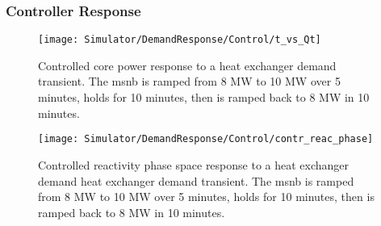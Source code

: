 \subsubsection{Controller Response}
\begin{figure}[ht!]
    \centering
    \texttt{[image: Simulator/DemandResponse/Control/t\_vs\_Qt]}
    \caption[Controlled Demand-Response Power Response ]{Controlled core power response to a heat exchanger demand transient. The \acs{msnb} is ramped from 8 MW to 10 MW over 5 minutes, holds for 10 minutes, then is ramped back to 8 MW in 10 minutes.}
    \label{fig:Demand-Power-Ctr}
\end{figure}

\begin{figure}[ht!]
    \centering
    \texttt{[image: Simulator/DemandResponse/Control/contr\_reac\_phase]}
    \caption[Controlled Demand-Response Reactivity Phase Space]{Controlled reactivity phase space response to a heat exchanger demand heat exchanger demand transient. The \acs{msnb} is ramped from 8 MW to 10 MW over 5 minutes, holds for 10 minutes, then is ramped back to 8 MW in 10 minutes.}
    \label{fig:Demand-ControlPhase-Ctr}
\end{figure}
\clearpage